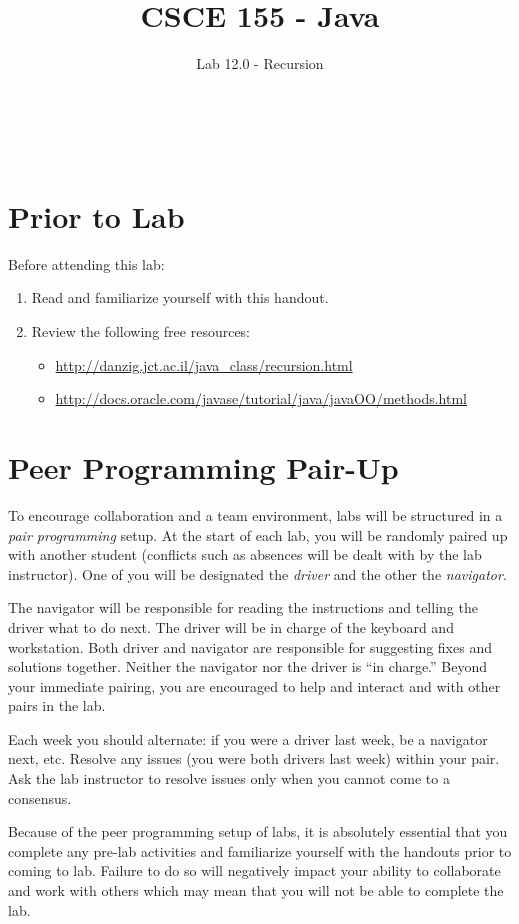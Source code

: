 \documentclass[12pt]{scrartcl}
\title{CSCE 155 - Java}
\subtitle{Lab 12.0 - Recursion}
\author{~}
\date{~}
\begin{document}
\maketitle

\section*{Prior to Lab}

Before attending this lab:
\begin{enumerate}
  \item Read and familiarize yourself with this handout.
  \item Review the following free resources:
	\begin{itemize}
  	  \item \url{http://danzig.jct.ac.il/java_class/recursion.html}
	  \item \url{http://docs.oracle.com/javase/tutorial/java/javaOO/methods.html}
	\end{itemize}
\end{enumerate}

\section*{Peer Programming Pair-Up}

To encourage collaboration and a team environment, labs will be
structured in a \emph{pair programming} setup.  At the start of
each lab, you will be randomly paired up with another student 
(conflicts such as absences will be dealt with by the lab instructor).
One of you will be designated the \emph{driver} and the other
the \emph{navigator}.  

The navigator will be responsible for reading the instructions and
telling the driver what to do next.  The driver will be in charge of the
keyboard and workstation.  Both driver and navigator are responsible
for suggesting fixes and solutions together.  Neither the navigator
nor the driver is ``in charge.''  Beyond your immediate pairing, you
are encouraged to help and interact and with other pairs in the lab.

Each week you should alternate: if you were a driver last week, 
be a navigator next, etc.  Resolve any issues (you were both drivers
last week) within your pair.  Ask the lab instructor to resolve issues
only when you cannot come to a consensus.  

Because of the peer programming setup of labs, it is absolutely 
essential that you complete any pre-lab activities and familiarize
yourself with the handouts prior to coming to lab.  Failure to do
so will negatively impact your ability to collaborate and work with 
others which may mean that you will not be able to complete the
lab.  
\end{document}
